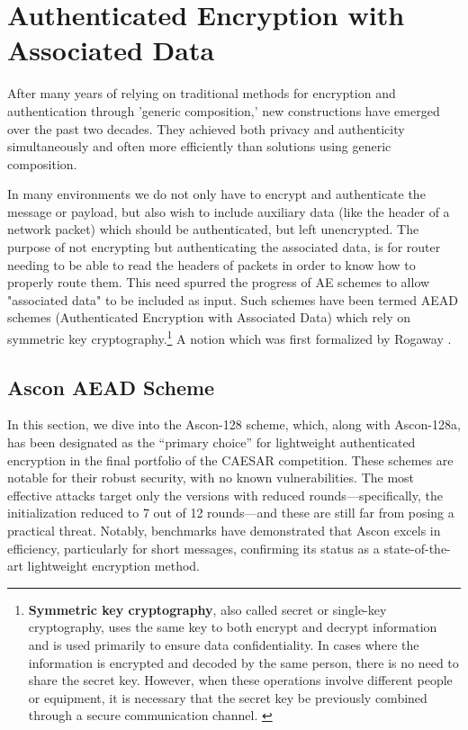 \section{Authenticated Encryption with Associated Data}
After many years of relying on traditional methods for encryption and authentication through 'generic composition,' new constructions have emerged over the past two decades. They achieved both privacy and authenticity simultaneously and often more efficiently than solutions using generic composition. \par

In many environments we do not only have to encrypt and authenticate the message or payload, but also wish to include auxiliary data (like the header of a network packet) which should be authenticated, but left unencrypted. \cite[Chapter 1]{Black2005}
The purpose of not encrypting but authenticating the associated data, is for router needing to be able to read the headers of packets in order to know how to properly route them. This need spurred the progress of AE schemes to allow "associated data" to be included as input. Such schemes have been termed AEAD schemes (Authenticated Encryption with Associated Data) which rely on symmetric key cryptography.\footnote[1]{\textbf{Symmetric key cryptography}, also called secret or single-key cryptography, uses the same key to both encrypt and decrypt information and is used primarily to ensure data confidentiality. In cases where the information is encrypted and decoded by the same person, there is no need to share the secret key. However, when these operations involve different people or equipment, it is necessary that the secret key be previously combined through a secure communication channel. \cite{Alencar2022Cryptography}}\cite[Chapter 1]{Black2005}
A notion which was first formalized by Rogaway \cite{10.1145/586110.586125}. \par

\subsection{Ascon AEAD Scheme}
In this section, we dive into the Ascon-128 scheme, which, along with Ascon-128a, has been designated as the “primary choice” for lightweight authenticated encryption in the final portfolio of the CAESAR competition. These schemes are notable for their robust security, with no known vulnerabilities. The most effective attacks target only the versions with reduced rounds—specifically, the initialization reduced to 7 out of 12 rounds—and these are still far from posing a practical threat. Notably, benchmarks have demonstrated that Ascon excels in efficiency, particularly for short messages, confirming its status as a state-of-the-art lightweight encryption method. \cite[Chapter 1]{Ascon-v1.2} \par

